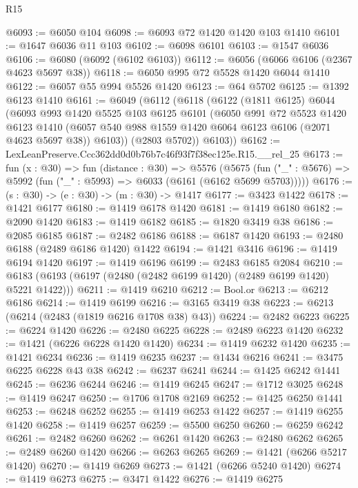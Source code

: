 \begin{lexlean}{R15}
\begin{coremodule}
@6093 := @6050 @104
@6098 := @6093 @72 @1420 @1420 @103 @1410
@6101 := @1647 @6036 @11 @103
@6102 := @6098 @6101
@6103 := @1547 @6036
@6106 := @6080 (@6092 (@6102 @6103))
@6112 := @6056 (@6066 @6106 (@2367 @4623 @5697 @38))
@6118 := @6050 @995 @72 @5528 @1420 @6044 @1410
@6122 := @6057 @55 @994 @5526 @1420
@6123 := @64 @5702
@6125 := @1392 @6123 @1410
@6161 := @6049
    (@6112
      (@6118
        (@6122
          (@1811 @6125)
          @6044
          (@6093
            @993
            @1420
            @5525
            @103
            @6125
            @6101
            (@6050
              @991
              @72
              @5523
              @1420
              @6123
              @1410
              (@6057 @540 @988 @1559 @1420 @6064 @6123 @6106 (@2071 @4623 @5697 @38))
              @6103))
          (@2803 @5702))
        @6103))
@6162 := LexLeanPreserve.Ccc362dd0d0b76b7c46f93f7f38ec125e.R15.__rel_25
@6173 := fun (x : @30) =>
  fun (distance : @30) =>
  @5576
    (@5675 (fun ("_" : @5676) => @5992 (fun ("_" : @5993) => @6033 (@6161 (@6162 @5699 @5703)))))
@6176 := (s : @30) -> (e : @30) -> (m : @30) -> @1417
@6177 := @3423 @1422
@6178 := @1421 @6177
@6180 := @1419 @6178 @1420
@6181 := @1419 @6180
@6182 := @2090 @1420
@6183 := @1419 @6182
@6185 := @1820 @3419 @38
@6186 := @2085 @6185
@6187 := @2482 @6186
@6188 := @6187 @1420
@6193 := @2480 @6188 (@2489 @6186 @1420) @1422
@6194 := @1421 @3416
@6196 := @1419 @6194 @1420
@6197 := @1419 @6196
@6199 := @2483 @6185 @2084
@6210 := @6183 (@6193 (@6197 (@2480 (@2482 @6199 @1420) (@2489 @6199 @1420) @5221 @1422)))
@6211 := @1419 @6210
@6212 := Bool.or
@6213 := @6212 @6186
@6214 := @1419 @6199
@6216 := @3165 @3419 @38
@6223 := @6213 (@6214 (@2483 (@1819 @6216 @1708 @38) @43))
@6224 := @2482 @6223
@6225 := @6224 @1420
@6226 := @2480 @6225
@6228 := @2489 @6223 @1420
@6232 := @1421 (@6226 @6228 @1420 @1420)
@6234 := @1419 @6232 @1420
@6235 := @1421 @6234
@6236 := @1419 @6235
@6237 := @1434 @6216
@6241 := @3475 @6225 @6228 @43 @38
@6242 := @6237 @6241
@6244 := @1425 @6242 @1441
@6245 := @6236 @6244
@6246 := @1419 @6245
@6247 := @1712 @3025
@6248 := @1419 @6247
@6250 := @1706 @1708 @2169
@6252 := @1425 @6250 @1441
@6253 := @6248 @6252
@6255 := @1419 @6253 @1422
@6257 := @1419 @6255 @1420
@6258 := @1419 @6257
@6259 := @5500 @6250
@6260 := @6259 @6242
@6261 := @2482 @6260
@6262 := @6261 @1420
@6263 := @2480 @6262
@6265 := @2489 @6260 @1420
@6266 := @6263 @6265
@6269 := @1421 (@6266 @5217 @1420)
@6270 := @1419 @6269
@6273 := @1421 (@6266 @5240 @1420)
@6274 := @1419 @6273
@6275 := @3471 @1422
@6276 := @1419 @6275

\end{coremodule}
\end{lexlean}
